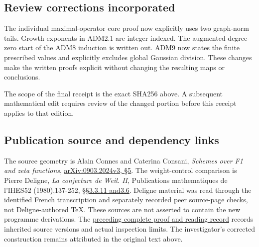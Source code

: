 \subsection{Review corrections
incorporated}\label{review-corrections-incorporated}

The individual maximal-operator core proof now explicitly uses two
graph-norm tails. Growth exponents in ADM2.1 are integer indexed. The
augmented degree-zero start of the ADM8 induction is written out. ADM9
now states the finite prescribed values and explicitly excludes global
Gaussian division. These changes make the written proofs explicit
without changing the resulting maps or conclusions.

The scope of the final receipt is the exact SHA256 above. A subsequent
mathematical edit requires review of the changed portion before this
receipt applies to that edition.

\subsection{Publication source and dependency
links}\label{publication-source-and-dependency-links}

The source geometry is Alain Connes and Caterina Consani, \emph{Schemes
over F1 and zeta functions},
\href{https://arxiv.org/abs/0903.2024v3}{arXiv:0903.2024v3, §5}. The
weight-control comparison is Pierre Deligne, \emph{La conjecture de
Weil. II}, Publications mathematiques de l'IHES52 (1980),137-252,
\href{https://www.numdam.org/item/PMIHES_1980__52__137_0/}{§§3.3.11
and3.6}. Deligne material was read through the identified French
transcription and separately recorded peer source-page checks, not
Deligne-authored TeX. These sources are not asserted to contain the new
programme derivations. The
\href{https://github.com/KokunoYumeto/zeta-function-research-reader/blob/36a82ecca98addb8a98b48204e349737856c7223/workbenches/splitzero-tandem/continuations/20260924-cohomology-weight-and-character-lifts/BUILD_AND_REVIEW.md}{preceding
complete proof and reading record} records inherited source versions and
actual inspection limits. The investigator's corrected construction
remains attributed in the original text above.
